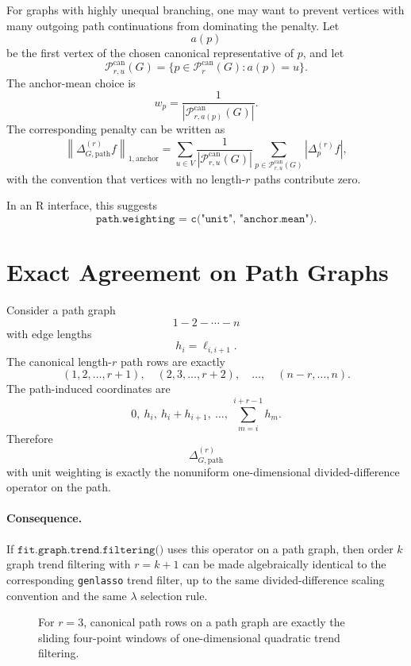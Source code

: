 \documentclass[11pt]{article}
\newcommand{\norm}[1]{\left\lVert #1 \right\rVert}
\newcommand{\Path}{\mathcal P}
\begin{document}
For graphs with highly unequal branching, one may want to prevent vertices
with many outgoing path continuations from dominating the penalty.  Let
\[
  a(p)
\]
be the first vertex of the chosen canonical representative of \(p\), and let
\[
  \Path_{r,u}^{\mathrm{can}}(G)
  =
  \{p\in \Path_r^{\mathrm{can}}(G): a(p)=u\}.
\]
The anchor-mean choice is
\[
  w_p
  =
  \frac{1}{|\Path_{r,a(p)}^{\mathrm{can}}(G)|}.
\]
The corresponding penalty can be written as
\[
  \norm{\Delta^{(r)}_{G,\mathrm{path}}f}_{1,\mathrm{anchor}}
  =
  \sum_{u\in V}
  \frac{1}{|\Path_{r,u}^{\mathrm{can}}(G)|}
  \sum_{p\in \Path_{r,u}^{\mathrm{can}}(G)}
  \left|\Delta^{(r)}_p f\right|,
\]
with the convention that vertices with no length-\(r\) paths contribute zero.

In an R interface, this suggests
\[
  \texttt{path.weighting = c("unit", "anchor.mean")}.
\]

\section{Exact Agreement on Path Graphs}

Consider a path graph
\[
  1-2-\cdots-n
\]
with edge lengths
\[
  h_i=\ell_{i,i+1}.
\]
The canonical length-\(r\) path rows are exactly
\[
  (1,2,\ldots,r+1),\quad
  (2,3,\ldots,r+2),\quad\ldots,\quad
  (n-r,\ldots,n).
\]
The path-induced coordinates are
\[
  0,\ h_i,\ h_i+h_{i+1},\ \ldots,\ \sum_{m=i}^{i+r-1}h_m.
\]
Therefore
\[
  \Delta^{(r)}_{G,\mathrm{path}}
\]
with unit weighting is exactly the nonuniform one-dimensional
divided-difference operator on the path.

\paragraph{Consequence.}
If \(\texttt{fit.graph.trend.filtering()}\) uses this operator on a path graph,
then order \(k\) graph trend filtering with \(r=k+1\) can be made
algebraically identical to the corresponding \texttt{genlasso} trend filter,
up to the same divided-difference scaling convention and the same
\(\lambda\) selection rule.

\begin{figure}[ht]
\centering
{}
\caption{For \(r=3\), canonical path rows on a path graph are exactly the
sliding four-point windows of one-dimensional quadratic trend filtering.}
\end{figure}
\end{document}
